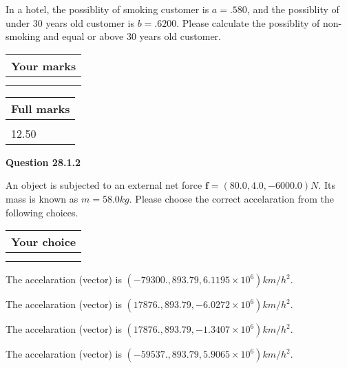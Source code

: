 \documentclass[12pt]{article}
\begin{document}
  
In a hotel, the possiblity of  %
smoking customer is
$a =  %
.580$, and the possiblity of  %
 under 30 years old customer is $ b =  %
.6200$.
Please calculate the possiblity of  %
 non-smoking and  %
equal or above 30 years old customer.
 

 

 
\vspace{0.3in}
  
\vspace{0.2in}
  
         \begin{tabular}{|l|}
\hline
 Your marks  \\
\hline
 \\ 
 \\ 
\hline
\end{tabular}
\hspace{0.05in} \begin{tabular}{|l|}
\hline
 Full marks  \\
\hline
 \\ 
12.50 \\
\hline
\end{tabular}
{\textbf{\Large{Question
28.1.2 
}}}
  
  
 
An object is subjected to an external net force $\mathbf{f}=(
80.0 ,
4.0,
-6000.0  )N$. Its mass is known as
$m= %
58.0  kg$. Please choose the correct accelaration
from the following choices.
 
  
  
\noindent\hspace{3.0in} \begin{tabular}{|l|}
\hline
Your choice \\
\hline
 \\ 
 \\ 
\hline
\end{tabular}
  
  
 
 
The accelaration (vector) is
$(
-79300.,
893.79 ,
6.1195 \times 10^{6}
)km/h^2.
$
 
 
The accelaration (vector) is
$(
17876.,
893.79 ,
-6.0272 \times 10^{6}
)km/h^2.
$
 
 
The accelaration (vector) is
$(
17876.,
893.79 ,
-1.3407 \times 10^{6}
)km/h^2.
$
 
 
The accelaration (vector) is
$(
-59537.,
893.79 ,
5.9065 \times 10^{6}
)km/h^2.
$
 
\end{document}
